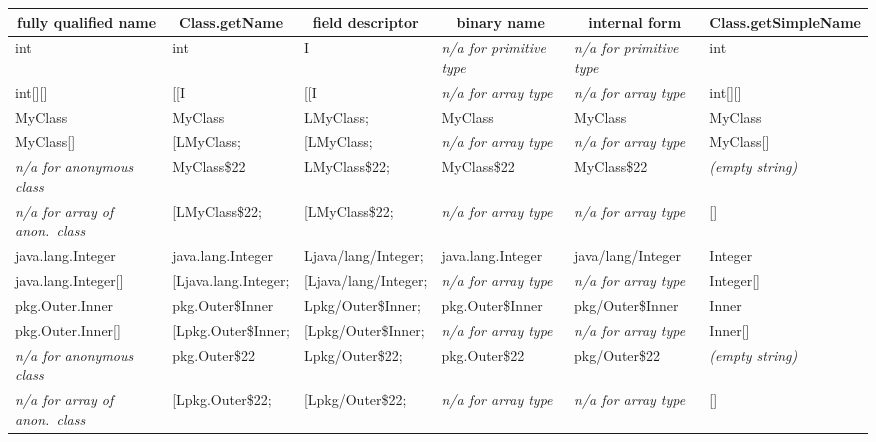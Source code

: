 \newcommand{\naforanon}{\emph{n/a {\smaller for anonymous class}}}
\newcommand{\naforanonarray}{\emph{n/a {\smaller for array of anon.~class}}}
\newcommand{\naforprim}{\emph{n/a {\smaller for primitive type}}}
\newcommand{\naforarray}{\emph{n/a {\smaller for array type}}}
\newcommand{\emptystring}{\emph{\smaller (empty string)}}

\begin{small}
\begin{center}
\begin{tabular}{|l|l|l|l|l|l|}
\hline
\multicolumn{1}{|c|}{fully qualified name} & \multicolumn{1}{c|}{Class.getName} & \multicolumn{1}{c|}{field descriptor} & \multicolumn{1}{c|}{binary name} & \multicolumn{1}{c|}{internal form} & \multicolumn{1}{c|}{Class.getSimpleName} \\ \hline
int                 & int                  & I                    & \naforprim          & \naforprim          & int            \\
int[][]             & [[I                  & [[I                  & \naforarray         & \naforarray         & int[][]        \\
MyClass             & MyClass              & LMyClass;            & MyClass             & MyClass             & MyClass        \\
MyClass[]           & [LMyClass;           & [LMyClass;           & \naforarray         & \naforarray         & MyClass[]      \\
\naforanon          & MyClass\$22          & LMyClass\$22;        & MyClass\$22         & MyClass\$22         & \emptystring \\
\naforanonarray     & [LMyClass\$22;       & [LMyClass\$22;       & \naforarray         & \naforarray         & []             \\
java.lang.Integer   & java.lang.Integer    & Ljava/lang/Integer;  & java.lang.Integer   & java/lang/Integer   & Integer        \\
java.lang.Integer[] & [Ljava.lang.Integer; & [Ljava/lang/Integer; & \naforarray         & \naforarray         & Integer[]      \\
pkg.Outer.Inner     & pkg.Outer\$Inner     & Lpkg/Outer\$Inner;   & pkg.Outer\$Inner    & pkg/Outer\$Inner    & Inner          \\
pkg.Outer.Inner[]   & [Lpkg.Outer\$Inner;  & [Lpkg/Outer\$Inner;  & \naforarray         & \naforarray         & Inner[]        \\
\naforanon          & pkg.Outer\$22        & Lpkg/Outer\$22;      & pkg.Outer\$22       & pkg/Outer\$22       & \emptystring \\
\naforanonarray     & [Lpkg.Outer\$22;     & [Lpkg/Outer\$22;     & \naforarray         & \naforarray         & []             \\
\hline
\end{tabular}
\end{center}
\end{small}

